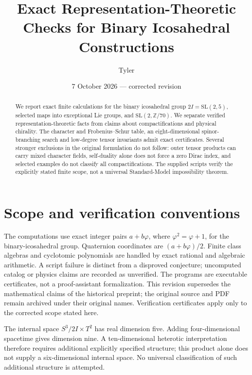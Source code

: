 \documentclass[11pt,a4paper]{amsart}
\title{Exact Representation-Theoretic Checks for Binary Icosahedral Constructions}
\author{Tyler}
\date{7 October 2026 --- corrected revision}
\newcommand{\Z}{\mathbb Z}
\newcommand{\SL}{\mathrm{SL}}
\begin{document}
\begin{abstract}
We report exact finite calculations for the binary icosahedral group
$2I=\SL(2,5)$, selected maps into exceptional Lie groups, and
$\SL(2,\Z/70)$. We separate verified representation-theoretic facts from
claims about compactifications and physical chirality. The character and
Frobenius--Schur table, an eight-dimensional spinor-branching search and
low-degree tensor invariants admit exact certificates. Several stronger
exclusions in the original formulation do not follow: outer tensor products
can carry mixed character fields, self-duality alone does not force a zero
Dirac index, and selected examples do not classify all compactifications.
The supplied scripts verify the explicitly stated finite scope, not a
universal Standard-Model impossibility theorem.
\end{abstract}
\maketitle

\section{Scope and verification conventions}
The computations use exact integer pairs $a+b\varphi$, where
$\varphi^2=\varphi+1$, for the binary-icosahedral group. Quaternion
coordinates are $(a+b\varphi)/2$. Finite class algebras and cyclotomic
polynomials are handled by exact rational and algebraic arithmetic.
A script failure is distinct from a disproved conjecture; uncomputed
catalog or physics claims are recorded as unverified. The programs are
executable certificates, not a proof-assistant formalization. This revision
supersedes the mathematical claims of the historical preprint; the original
source and PDF remain archived under their original names. Verification
certificates apply only to the corrected scope stated here.

The internal space $S^3/2I\times T^2$ has real dimension five. Adding
four-dimensional spacetime gives dimension nine. A ten-dimensional
heterotic interpretation therefore requires additional explicitly specified
structure; this product alone does not supply a six-dimensional internal
space. No universal classification of such additional structure is attempted.
\end{document}
